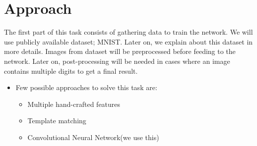 \documentclass[12pt, letterpaper]{article}
\begin{document}
\section{Approach}
The first part of this task consists of gathering data to train the network. We will use publicly available dataset; MNIST. Later on, we explain about this dataset in more details.  
Images from dataset will be preprocessed before feeding to the network. Later on, post-processing will be needed in cases where an image contains multiple digits to get a final result. 
\begin{itemize}
	\item Few possible approaches to solve this task are:
		\begin{itemize}
			\item Multiple hand-crafted features
			\item Template matching
			\item Convolutional Neural Network(we use this)
		\end{itemize}
			
\end{itemize}
\end{document}
